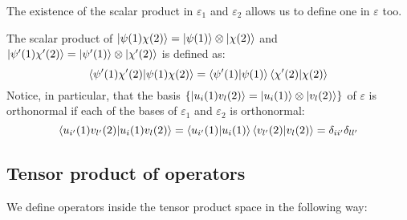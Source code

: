 The existence of the scalar product in $\varepsilon_1$ and $\varepsilon_2$ allows us to define one in $\varepsilon$ too.

\begin{definition}
    The scalar product of $\ket{\psi(1)\chi(2)} = \ket{\psi(1)}\otimes\ket{\chi(2)}$ and $\ket{\psi'(1)\chi'(2)} = \ket{\psi'(1)}\otimes\ket{\chi'(2)}$ is defined as:
    \begin{equation}
        \braket{\psi'(1)\chi'(2)|\psi(1)\chi(2)} = \braket{\psi'(1)|\psi(1)}\braket{\chi'(2)|\chi(2)}
    \end{equation}
    Notice, in particular, that the basis $\{\ket{u_i(1)v_l(2)} = \ket{u_i(1)}\otimes\ket{v_l(2)}\}$ of $\varepsilon$ is orthonormal if each of the bases of $\varepsilon_1$ and $\varepsilon_2$ is orthonormal:
    \begin{equation}
        \braket{u_{i'}(1)v_{l'}(2)|u_i(1)v_l(2)} = \braket{u_{i'}(1)|u_{i}(1)}\braket{v_{l'}(2)|v_l(2)} = \delta_{ii'}\delta_{ll'}
    \end{equation}
\end{definition}

\subsection{Tensor product of operators} \label{tensor_product_of_operators}

We define operators inside the tensor product space in the following way:


